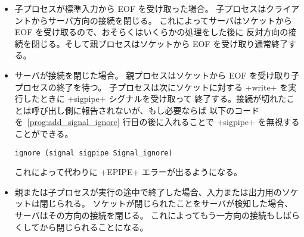 \begin{itemize}
\item 子プロセスが標準入力から EOF を受け取った場合。
  子プロセスはクライアントからサーバ方向の接続を閉じる。
  これによってサーバはソケットから EOF を受け取るので、おそらくはいくらかの処理をした後に
  反対方向の接続を閉じる。そして親プロセスはソケットから EOF を受け取り通常終了する。
%
\item サーバが接続を閉じた場合。
  親プロセスはソケットから EOF を受け取り子プロセスの終了を待つ。
  子プロセスは次にソケットに対する \ml+write+ を実行したときに \ml+sigpipe+ シグナルを受け取って
  終了する。接続が切れたことは呼び出し側に報告されないが、もし必要ならば
  以下のコードを~\ref{prog:add_signal_ignore} 行目の後に入れることで \ml+sigpipe+ を無視することができる。
\begin{lstlisting}
ignore (signal sigpipe Signal_ignore)
\end{lstlisting}

\noindent これによって代わりに \ml+EPIPE+ エラーが出るようになる。
%
\item 親または子プロセスが実行の途中で終了した場合、入力または出力用のソケットは閉じられる。
  ソケットが閉じられたことをサーバが検知した場合、サーバはその方向の接続を閉じる。
  これによってもう一方向の接続もしばらくしてから閉じられることになる。
\end{itemize}



